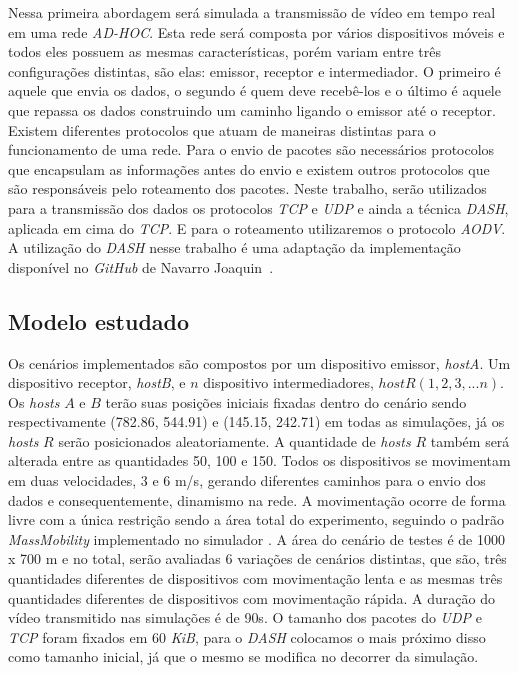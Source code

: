\documentclass[12pt]{article}
\begin{document}
	Nessa primeira abordagem será simulada a transmissão de vídeo em tempo real em uma rede \textit{AD-HOC}. Esta rede será composta por vários dispositivos móveis e todos eles possuem as mesmas características, porém variam entre três configurações distintas, são elas: emissor, receptor e intermediador. O primeiro é aquele que envia os dados, o segundo é quem deve recebê-los e o último é aquele que repassa os dados construindo um caminho ligando o emissor até o receptor. Existem diferentes protocolos que atuam de maneiras distintas para o funcionamento de uma rede. Para o envio de pacotes são necessários protocolos que encapsulam as informações antes do envio e existem outros protocolos que são responsáveis pelo roteamento dos pacotes. Neste trabalho, serão utilizados para a transmissão dos dados os protocolos \textit{TCP} e \textit{UDP} e ainda a técnica \textit{DASH}, aplicada em cima do \textit{TCP}. E para o roteamento utilizaremos o protocolo \textit{AODV}. A utilização do \textit{DASH} nesse trabalho é uma adaptação da implementação disponível no \textit{GitHub} de Navarro Joaquin~\cite{navarro}.%
    
\subsection{Modelo estudado}
	Os cenários implementados são compostos por um dispositivo emissor, \textit{hostA}. Um dispositivo receptor, \textit{hostB}, e $n$ dispositivo intermediadores, $hostR (1,2,3, ... n)$. Os \textit{hosts} $A$ e $B$ terão suas posições iniciais fixadas dentro do cenário sendo respectivamente (782.86, 544.91) e (145.15, 242.71) em todas as simulações, já os \textit{hosts} $R$ serão posicionados aleatoriamente. A quantidade de \textit{hosts} $R$ também será alterada entre as quantidades 50, 100 e 150. Todos os dispositivos se movimentam em duas velocidades, 3 e 6 m/s, gerando diferentes caminhos para o envio dos dados e consequentemente, dinamismo na rede. A movimentação ocorre de forma livre com a única restrição sendo a área total do experimento, seguindo o padrão \textit{MassMobility} implementado no simulador \cite{inet}. A área do cenário de testes é de 1000 x 700 m e no total, serão avaliadas 6 variações de cenários distintas, que são, três quantidades diferentes de dispositivos com movimentação lenta e as mesmas três quantidades diferentes de dispositivos com movimentação rápida. A duração do vídeo transmitido nas simulações é de 90s. O tamanho dos pacotes do \textit{UDP} e \textit{TCP} foram fixados em 60 \textit{KiB}, para o \textit{DASH} colocamos o mais próximo disso como tamanho inicial, já que o mesmo se modifica no decorrer da simulação.
\end{document}
